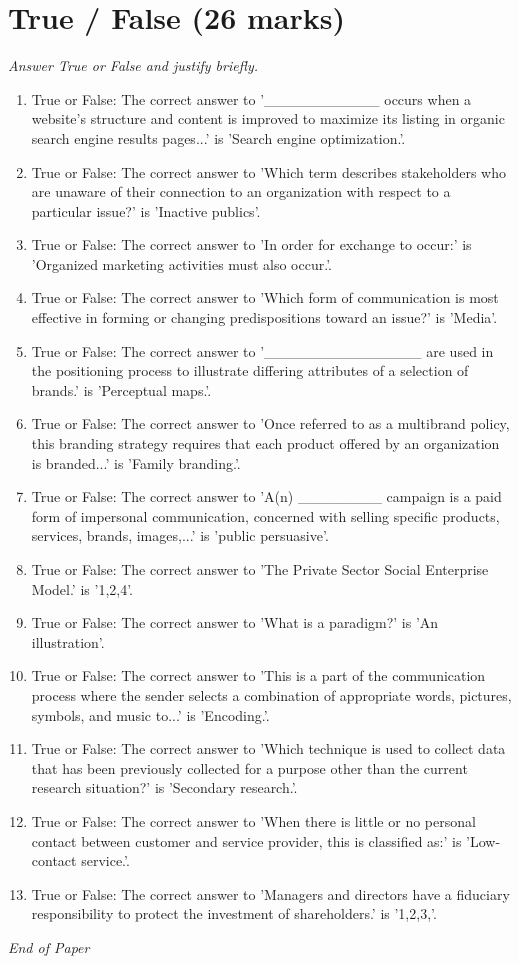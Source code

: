 \documentclass[12pt]{article}
\begin{document}
\section*{True / False (26 marks)}
\textit{Answer True or False and justify briefly.}
\begin{enumerate}[label=\arabic*.]
\item True or False: The correct answer to '\_\_\_\_\_\_\_\_\_\_\_ occurs when a website's structure and content is improved to maximize its listing in organic search engine results pages...' is 'Search engine optimization.'.
\item True or False: The correct answer to 'Which term describes stakeholders who are unaware of their connection to an organization with respect to a particular issue?' is 'Inactive publics'.
\item True or False: The correct answer to 'In order for exchange to occur:' is 'Organized marketing activities must also occur.'.
\item True or False: The correct answer to 'Which form of communication is most effective in forming or changing predispositions toward an issue?' is 'Media'.
\item True or False: The correct answer to '\_\_\_\_\_\_\_\_\_\_\_\_\_\_\_ are used in the positioning process to illustrate differing attributes of a selection of brands.' is 'Perceptual maps.'.
\item True or False: The correct answer to 'Once referred to as a multibrand policy, this branding strategy requires that each product offered by an organization is branded...' is 'Family branding.'.
\item True or False: The correct answer to 'A(n) \_\_\_\_\_\_\_\_ campaign is a paid form of impersonal communication, concerned with selling specific products, services, brands, images,...' is 'public persuasive'.
\item True or False: The correct answer to 'The Private Sector Social Enterprise Model.' is '1,2,4'.
\item True or False: The correct answer to 'What is a paradigm?' is 'An illustration'.
\item True or False: The correct answer to 'This is a part of the communication process where the sender selects a combination of appropriate words, pictures, symbols, and music to...' is 'Encoding.'.
\item True or False: The correct answer to 'Which technique is used to collect data that has been previously collected for a purpose other than the current research situation?' is 'Secondary research.'.
\item True or False: The correct answer to 'When there is little or no personal contact between customer and service provider, this is classified as:' is 'Low-contact service.'.
\item True or False: The correct answer to 'Managers and directors have a fiduciary responsibility to protect the investment of shareholders.' is '1,2,3,'.
\end{enumerate}

\vfill
\noindent\textit{End of Paper}
\end{document}
